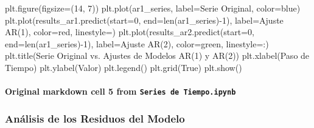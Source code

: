 \documentclass[
  11pt,
]{article}
\newenvironment{Shaded}{}{}
\newcommand{\BuiltInTok}[1]{\textcolor[rgb]{0.00,0.50,0.00}{#1}}
\newcommand{\DecValTok}[1]{\textcolor[rgb]{0.25,0.63,0.44}{#1}}
\newcommand{\NormalTok}[1]{#1}
\newcommand{\OperatorTok}[1]{\textcolor[rgb]{0.40,0.40,0.40}{#1}}
\newcommand{\StringTok}[1]{\textcolor[rgb]{0.25,0.44,0.63}{#1}}
\newcommand{\VariableTok}[1]{\textcolor[rgb]{0.10,0.09,0.49}{#1}}
\begin{document}
\begin{Shaded}
\begin{Highlighting}[]
\NormalTok{plt.figure(figsize}\OperatorTok{=}\NormalTok{(}\DecValTok{14}\NormalTok{, }\DecValTok{7}\NormalTok{))}
\NormalTok{plt.plot(ar1\_series, label}\OperatorTok{=}\StringTok{\textquotesingle{}Serie Original\textquotesingle{}}\NormalTok{, color}\OperatorTok{=}\StringTok{\textquotesingle{}blue\textquotesingle{}}\NormalTok{)}
\NormalTok{plt.plot(results\_ar1.predict(start}\OperatorTok{=}\DecValTok{0}\NormalTok{, end}\OperatorTok{=}\BuiltInTok{len}\NormalTok{(ar1\_series)}\OperatorTok{{-}}\DecValTok{1}\NormalTok{), label}\OperatorTok{=}\StringTok{\textquotesingle{}Ajuste AR(1)\textquotesingle{}}\NormalTok{, color}\OperatorTok{=}\StringTok{\textquotesingle{}red\textquotesingle{}}\NormalTok{, linestyle}\OperatorTok{=}\StringTok{\textquotesingle{}{-}{-}\textquotesingle{}}\NormalTok{)}
\NormalTok{plt.plot(results\_ar2.predict(start}\OperatorTok{=}\DecValTok{0}\NormalTok{, end}\OperatorTok{=}\BuiltInTok{len}\NormalTok{(ar1\_series)}\OperatorTok{{-}}\DecValTok{1}\NormalTok{), label}\OperatorTok{=}\StringTok{\textquotesingle{}Ajuste AR(2)\textquotesingle{}}\NormalTok{, color}\OperatorTok{=}\StringTok{\textquotesingle{}green\textquotesingle{}}\NormalTok{, linestyle}\OperatorTok{=}\StringTok{\textquotesingle{}:\textquotesingle{}}\NormalTok{)}
\NormalTok{plt.title(}\StringTok{\textquotesingle{}Serie Original vs. Ajustes de Modelos AR(1) y AR(2)\textquotesingle{}}\NormalTok{)}
\NormalTok{plt.xlabel(}\StringTok{\textquotesingle{}Paso de Tiempo\textquotesingle{}}\NormalTok{)}
\NormalTok{plt.ylabel(}\StringTok{\textquotesingle{}Valor\textquotesingle{}}\NormalTok{)}
\NormalTok{plt.legend()}
\NormalTok{plt.grid(}\VariableTok{True}\NormalTok{)}
\NormalTok{plt.show()}
\end{Highlighting}
\end{Shaded}

\paragraph{\texorpdfstring{Original markdown cell 5 from \texttt{Series\ de\ Tiempo.ipynb}}{Original markdown cell 5 from Series de Tiempo.ipynb}}\label{original-markdown-cell-5-from-series-de-tiempoipynb}

\subsubsection{Análisis de los Residuos del Modelo}\label{anuxe1lisis-de-los-residuos-del-modelo}
\end{document}
